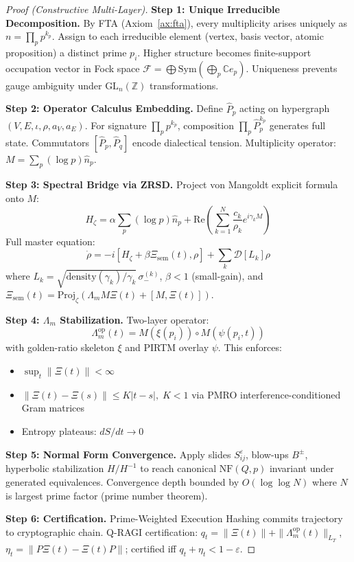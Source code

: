 \documentclass[12pt]{amsart}
\theoremstyle{plain}
\begin{document}
\begin{proof}[Proof (Constructive Multi-Layer)]
\textbf{Step 1: Unique Irreducible Decomposition.}
By FTA (Axiom~\ref{ax:fta}), every multiplicity arises uniquely as \(n = \prod_p p^{k_p}\). Assign to each irreducible element (vertex, basis vector, atomic proposition) a distinct prime \(p_i\). Higher structure becomes finite-support occupation vector in Fock space \(\mathcal{F} = \bigoplus \text{Sym}(\bigoplus_p \mathbb{C} e_p)\). Uniqueness prevents gauge ambiguity under \(\text{GL}_n(\mathbb{Z})\) transformations.

\textbf{Step 2: Operator Calculus Embedding.}
Define \(\hat{P}_p\) acting on hypergraph \((V,E,\iota,\rho,a_V,a_E)\). For signature \(\prod_p p^{k_p}\), composition \(\prod_p \hat{P}_p^{k_p}\) generates full state. Commutators \([\hat{P}_p, \hat{P}_q]\) encode dialectical tension. Multiplicity operator: \(M = \sum_p (\log p) \hat{n}_p\).

\textbf{Step 3: Spectral Bridge via ZRSD.}
Project von Mangoldt explicit formula onto \(M\):
\[
H_\zeta = \alpha \sum_p (\log p) \hat{n}_p + \text{Re}\left(\sum_{k=1}^N \frac{c_k}{\rho_k} e^{i\gamma_k M}\right)
\]
Full master equation:
\[
\dot{\rho} = -i[H_\zeta + \beta \Xi_{\text{sem}}(t), \rho] + \sum_k \mathcal{D}[L_k]\rho
\]
where \(L_k = \sqrt{\text{density}(\gamma_k)/\gamma_k} \,\sigma_-^{(k)}\), \(\beta < 1\) (small-gain), and \(\Xi_{\text{sem}}(t) = \text{Proj}_\zeta(\Lambda_m M \Xi(t) + [M, \Xi(t)])\).

\textbf{Step 4: \(\Lambda_m\) Stabilization.}
Two-layer operator:
\[
\Lambda_m^{\text{op}}(t) = M(\xi(p_i)) \circ M(\psi(p_i,t))
\]
with golden-ratio skeleton \(\xi\) and PIRTM overlay \(\psi\). This enforces:
\begin{itemize}[leftmargin=*]
\item \(\sup_t \|\Xi(t)\| < \infty\)
\item \(\|\Xi(t) - \Xi(s)\| \leq K|t-s|, \; K < 1\) via PMRO interference-conditioned Gram matrices
\item Entropy plateaus: \(dS/dt \to 0\)
\end{itemize}

\textbf{Step 5: Normal Form Convergence.}
Apply slides \(S_{ij}^\varepsilon\), blow-ups \(B^\pm\), hyperbolic stabilization \(H/H^{-1}\) to reach canonical \(\text{NF}(Q,p)\) invariant under generated equivalences. Convergence depth bounded by \(O(\log \log N)\) where \(N\) is largest prime factor (prime number theorem).

\textbf{Step 6: Certification.}
Prime-Weighted Execution Hashing commits trajectory to cryptographic chain. Q-RAGI certification: \(q_t = \|\Xi(t)\| + \|\Lambda_m^{\text{op}}(t)\|_{L_T}\), \(\eta_t = \|P\Xi(t) - \Xi(t)P\|\); certified iff \(q_t + \eta_t < 1 - \varepsilon\).
\end{proof}
\end{document}

